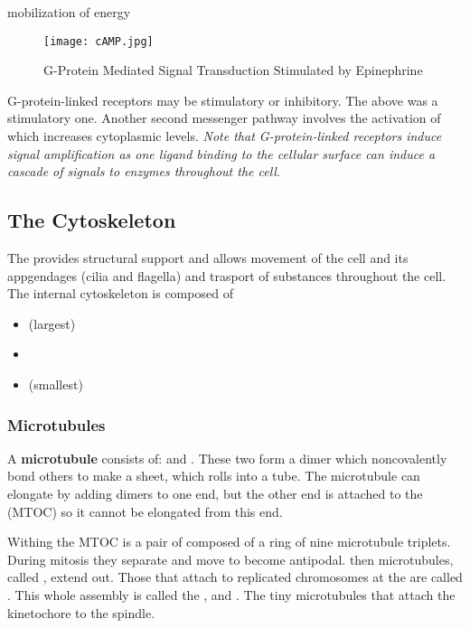 \documentclass[../Bio_chemistryReview.tex]{subfiles}
\begin{document}
\begin{description}
\begin{enumerate}
              mobilization of energy
      \end{enumerate}
      \begin{figure}[H]
          \centering
          \texttt{[image: cAMP.jpg]}
          \caption{G-Protein Mediated Signal Transduction Stimulated by
          Epinephrine}
          \label{fig:cAMP}
      \end{figure}
      G-protein-linked receptors may be stimulatory or inhibitory. The above was
      a stimulatory one. Another second messenger pathway involves the
      activation of  which increases
      cytoplasmic  levels. \textit{Note that G-protein-linked
          receptors induce signal amplification as one ligand binding to the
          cellular surface can induce a cascade of signals to enzymes throughout
      the cell}.
\end{description}

\subsection{The Cytoskeleton}
The  provides structural support and allows movement of
the cell and its appgendages (cilia and flagella) and trasport of substances
throughout the cell. The internal cytoskeleton is composed of 
\begin{itemize}
    \item {} (largest)
    \item {}
    \item {} (smallest)
\end{itemize}

\subsubsection{Microtubules}
A \textbf{microtubule} consists of:  and
. These two form a dimer which noncovalently bond
others to make a sheet, which rolls into a tube. The microtubule can elongate by
adding dimers to one end, but the other end is attached to the
 (MTOC) so it cannot be elongated from
this end.\par

Withing the MTOC is a pair of  composed of a ring of nine
microtubule triplets. During mitosis they separate and move to become antipodal.
then microtubules, called , extend out. Those that attach to
replicated chromosomes at the  are called . This whole assembly is called the , and
. The tiny microtubules that attach the kinetochore
to the spindle.
\end{document}
